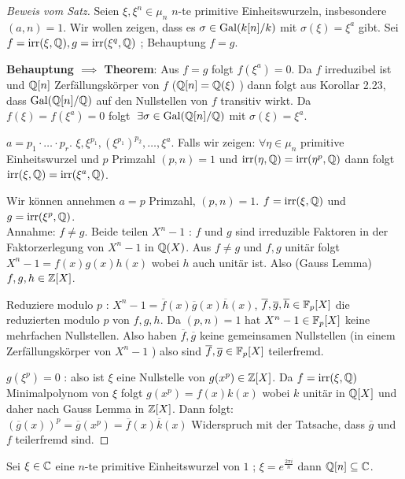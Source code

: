 \begin{proof}[Beweis vom Satz]
	Seien $\xi, \xi^{n} \in \mu_{n}$ $n$-te primitive Einheitswurzeln, insbesondere $(a,n) = 1$.
	Wir wollen zeigen, dass es $\sigma \in \operatorname{Gal}(k[n] / k)$ mit $\sigma(\xi) = \xi^{a}$ gibt.
	Sei $f = \operatorname{irr}(\xi,\mathbb{Q}), g = \operatorname{irr}(\xi^{q},\mathbb{Q})$ ; Behauptung $f=g$. 

	\textbf{Behauptung $\implies$ Theorem}: Aus $f = g$ folgt $f(\xi^{a}) = 0$. Da $f$ irreduzibel ist und $\mathbb{Q}[n]$ Zerfällungskörper von $f$ ($\mathbb{Q}[n] = \mathbb{Q}(\xi)$ )
	dann folgt aus Korollar 2.23, dass $\operatorname{Gal}(\mathbb{Q}[n] / \mathbb{Q})$ auf den Nullstellen von $f$ transitiv wirkt.
	Da $f(\xi) = f(\xi^{a}) = 0$ folgt $\exists \sigma \in \gal(\Q[n] / \Q)$ mit $\sigma(\xi) = \xi^{a}$.

	$a = p_1 \cdot \ldots \cdot p_{r}$. $\xi, \xi^{p_1}, (\xi^{p_1})^{p_2},\ldots, \xi^{a}$. 
	Falls wir zeigen: $\forall \eta \in \mu_{n}$ primitive Einheitswurzel und $p$ Primzahl $(p,n) = 1$ und 
	$\operatorname{irr}(\eta, \mathbb{Q}) = \operatorname{irr}(\eta^{p},\mathbb{Q})$ dann folgt $\operatorname{irr}(\xi, \mathbb{Q}) = \operatorname{irr}(\xi^{a},\mathbb{Q})$.

	Wir können annehmen $a = p$ Primzahl, $(p,n) = 1$. $f = \operatorname{irr}(\xi,\mathbb{Q})$ und $g = \operatorname{irr}(\xi^{p},\mathbb{Q})$.\\
	Annahme: $f \neq g$. Beide teilen $X^{n}-1$ : $f$ und $g$ sind irreduzible Faktoren in der Faktorzerlegung von $X^{n}-1$ in $\mathbb{Q}(X)$.
	Aus $f \neq g$ und $f,g$ unitär folgt $X^{n}-1 = f(x) g(x) h(x)$ wobei $h$ auch unitär ist. 
	Also (Gauss Lemma) $f,g,h \in \mathbb{Z}[X]$.

	Reduziere modulo $p$ : $X^{n}-1 = \overline{f}(x) \overline{g}(x) \overline{h}(x)$, $\overline{f},\overline{g},\overline{h} \in \mathbb{F}_{p}[X]$ die reduzierten modulo $p$ von $f,g,h$.
	Da $(p,n) = 1$ hat $X^{n}-1 \in \mathbb{F}_{p}[X]$ keine mehrfachen Nullstellen.
	Also haben $\overline{f}, \overline{g}$ keine gemeinsamen Nullstellen (in einem Zerfällungskörper von $X^{n}-1$ )
	also sind $\overline{f},\overline{g} \in \mathbb{F}_{p}[X]$ teilerfremd.

	$g(\xi^{p}) = 0$ : also ist $\xi$ eine Nullstelle von $g(x^{p}) \in \mathbb{Z}[X]$.
	Da $f = \operatorname{irr}(\xi,\mathbb{Q})$ Minimalpolynom von $\xi$ folgt $g(x^{p}) = f(x) k(x)$
	wobei $k$ unitär in  $\mathbb{Q}[X]$ und daher nach Gauss Lemma in $\mathbb{Z}[X]$.
	Dann folgt: $(\overline{g}(x))^{p} = \overline{g}(x^{p}) = \overline{f}(x) \overline{k}(x)$ Widerspruch mit der Tatsache,
	dass $\overline{g}$ und $f$ teilerfremd sind.
\end{proof}

Sei $\xi \in \mathbb{C}$ eine $n$-te primitive Einheitswurzel von $1$ ; $\xi = e^{\frac{2\pi i}{n}}$ dann $\mathbb{Q}[n] \subseteq \mathbb{C}$.


